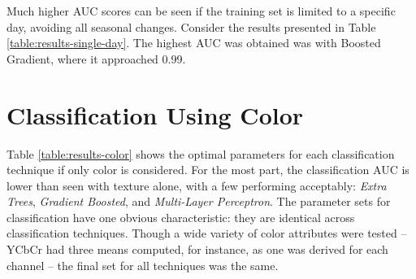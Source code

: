 \documentclass[letterpaper]{report}
\begin{document}
 Much higher AUC scores can be seen if the training set is limited to a specific day, avoiding all seasonal changes.  Consider the results presented in Table \ref{table:results-single-day}. The highest AUC was obtained was with Boosted Gradient, where it approached 0.99.


\begin{tiny}
\renewcommand{\arraystretch}{1.2}




\end{tiny}



\section{Classification Using Color}
Table \ref{table:results-color} shows the optimal parameters for each classification technique if only color is considered. For the most part, the classification AUC is lower than seen with texture alone, with a few performing acceptably: \textit{Extra Trees}, \textit{Gradient Boosted}, and \textit{Multi-Layer Perceptron}.  The parameter sets for classification have one obvious characteristic: they are identical across classification techniques. Though a wide variety of color attributes were tested -- YCbCr had three means computed, for instance, as one was derived for each channel -- the final set for all techniques was the same.
\end{document}
